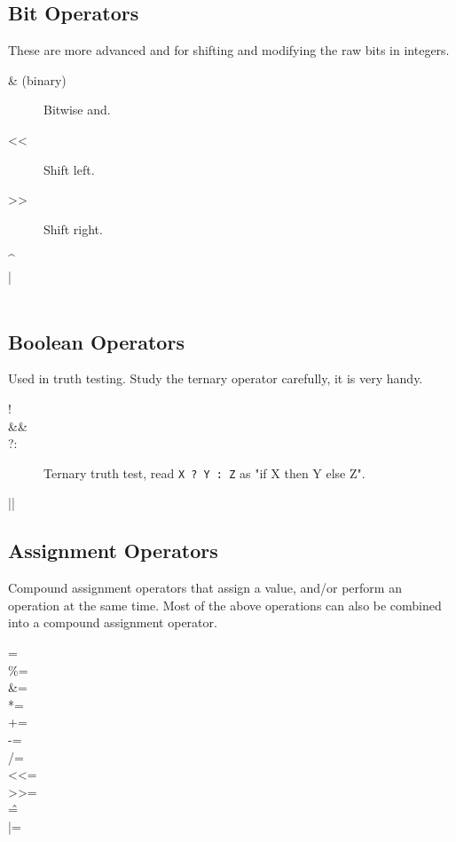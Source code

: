 \subsection{Bit Operators}

These are more advanced and for shifting and modifying the 
raw bits in integers.

\begin{description}
\item[\& (binary)] Bitwise and.
\item[<<] Shift left.
\item[>>] Shift right.
\item[\^]
\item[|]
\item[~]
\end{description}


\subsection{Boolean Operators}

Used in truth testing.  Study the ternary
operator carefully, it is very handy.

\begin{description}
\item[!]
\item[\&\&]
\item[?:] Ternary truth test, read \verb|X ? Y : Z| as "if X then Y else Z".
\item[||]
\end{description}

\subsection{Assignment Operators}

Compound assignment operators that assign a value, and/or perform
an operation at the same time.  Most of the above operations
can also be combined into a compound assignment operator.

\begin{description}
\item[=]
\item[\%=]
\item[&=]
\item[*=]
\item[+=]
\item[-=]
\item[/=]
\item[<<=]
\item[>>=]
\item[\^=]
\item[|=]
\end{description}

